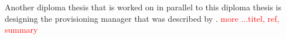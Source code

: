 Another diploma thesis that is worked on in parallel to this diploma thesis is designing the provisioning manager that was described by \citeauthor*{provisioning:dynamic}.
\textcolor{red}{more ...titel, ref, summary}
